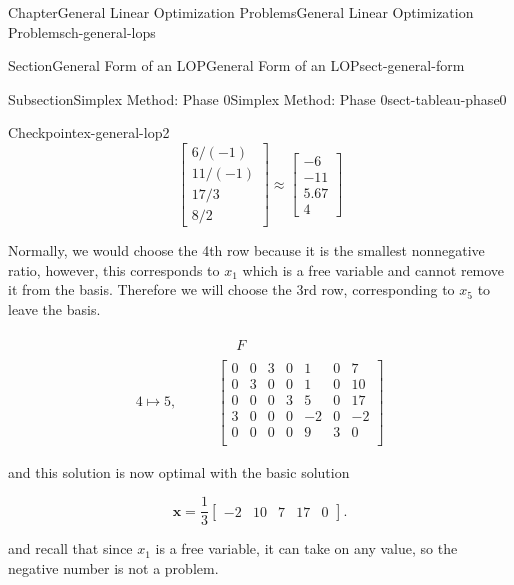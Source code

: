 \documentclass[oneside,10pt,]{book}
\numberwithin{equation}{section}
\newcommand{\amp}{&}
\begin{document}
\begin{chapterptx}{Chapter}{General Linear Optimization Problems}{}{General Linear Optimization Problems}{}{}{ch-general-lops}
\begin{sectionptx}{Section}{General Form of an LOP}{}{General Form of an LOP}{}{}{sect-general-form}
\begin{subsectionptx}{Subsection}{Simplex Method: Phase 0}{}{Simplex Method: Phase 0}{}{}{sect-tableau-phase0}
\begin{inlineexercise}{Checkpoint}{}{ex-general-lop2}
\begin{equation*}
\begin{bmatrix} 6/(-1) \\ 11/(-1) \\ 17/3 \\ 8/2 \end{bmatrix} \approx \begin{bmatrix} -6 \\ -11 \\ 5.67 \\ 4 \end{bmatrix}
\end{equation*}
%
\par
Normally, we would choose the 4th row because it is the smallest nonnegative ratio, however, this corresponds to \(x_1\) which is a free variable and cannot remove it from the basis. Therefore we will choose the 3rd row, corresponding to \(x_5\) to leave the basis.%
\par
%
\begin{align*}
\amp\begin{array}{rrrrrr}\phantom{11} F \end{array}\\
4 \mapsto 5, \qquad \amp\left[\begin{array}{rr|rrrr|r} 0 \amp 0 \amp 3 \amp 0 \amp 1 \amp 0 \amp 7\\ 0 \amp 3 \amp 0 \amp 0 \amp 1 \amp 0 \amp 10\\ 0 \amp 0 \amp 0 \amp 3 \amp 5 \amp 0 \amp 17\\ 3 \amp 0 \amp 0 \amp 0 \amp -2 \amp 0 \amp -2\\ \hline 0 \amp 0 \amp 0 \amp 0 \amp 9 \amp 3 \amp 0\\ \end{array} \right]
\end{align*}
%
\par
and this solution is now optimal with the basic solution%
\par
%
\begin{equation*}
\boldsymbol{x} = \frac{1}{3} \left[\begin{array}{rr|rrrr} -2 \amp 10 \amp 7 \amp 17 \amp 0\end{array}\right].
\end{equation*}
%
\par
and recall that since \(x_1\) is a free variable, it can take on any value, so the negative number is not a problem.%
\end{inlineexercise}%
\end{subsectionptx}
%
%
\typeout{************************************************}

\end{sectionptx}
\end{chapterptx}
\end{document}
